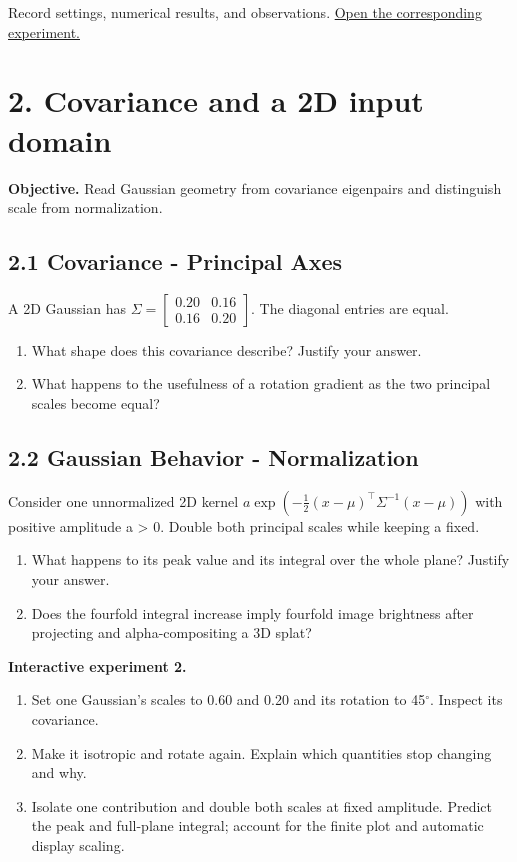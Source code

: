 \documentclass[11pt,a4paper]{article}
\begin{document}
Record settings, numerical results, and observations.
\href{https://sosekie.github.io/Unibe-CVG-CV-Interactive-Labs/tutorial-09/#mixture}{Open the corresponding experiment.}\par
{}\section*{2. Covariance and a 2D input domain}
\noindent\textbf{Objective.} Read Gaussian geometry from covariance eigenpairs and distinguish scale from normalization.
\subsection*{2.1 Covariance - Principal Axes}
A 2D Gaussian has $\Sigma=\begin{bmatrix}0.20&0.16\\0.16&0.20\end{bmatrix}$.
The diagonal entries are equal.
\begin{enumerate}[label=(\alph*),nosep]
\item What shape does this covariance describe?
Justify your answer.
\item What happens to the usefulness of a rotation gradient as the two principal scales become equal?
\end{enumerate}
\subsection*{2.2 Gaussian Behavior - Normalization}
Consider one unnormalized 2D kernel $a\exp(-\frac12(x-\mu)^\top\Sigma^{-1}(x-\mu))$ with positive amplitude a > 0.
Double both principal scales while keeping a fixed.
\begin{enumerate}[label=(\alph*),nosep]
\item What happens to its peak value and its integral over the whole plane?
Justify your answer.
\item Does the fourfold integral increase imply fourfold image brightness after projecting and alpha-compositing a 3D splat?
\end{enumerate}
\noindent\textbf{Interactive experiment 2.}\begin{enumerate}[nosep]
\item Set one Gaussian’s scales to 0.60 and 0.20 and its rotation to 45${}^\circ$.
Inspect its covariance.
\item Make it isotropic and rotate again.
Explain which quantities stop changing and why.
\item Isolate one contribution and double both scales at fixed amplitude.
Predict the peak and full-plane integral; account for the finite plot and automatic display scaling.
\end{enumerate}
\end{document}
